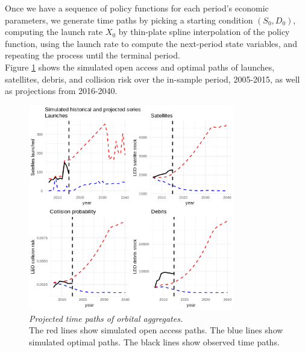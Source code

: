 \documentclass[12pt]{article}
\begin{document}
Once we have a sequence of policy functions for each period's economic parameters, we generate time paths by picking a starting condition $(S_0,D_0)$, computing the launch rate $X_0$ by thin-plate spline interpolation of the policy function, using the launch rate to compute the next-period state variables, and repeating the process until the terminal period. \\

Figure \ref{simulated_projected_path_of_states} shows the simulated open access and optimal paths of launches, satellites, debris, and collision risk over the in-sample period, 2005-2015, as well as projections from 2016-2040. 


\begin{figure}[H]
	\centering
	\includegraphics[width=0.8\textwidth]{../../images/simulated_projected_series.png}
	\captionsetup{format=hang}
	\caption[Projected time paths of orbital aggregates]{\textit{Projected time paths of orbital aggregates.} \\
		The red lines show simulated open access paths. The blue lines show simulated optimal paths. The black lines show observed time paths.
	}
	\label{simulated_projected_path_of_states}
\end{figure}
\end{document}
